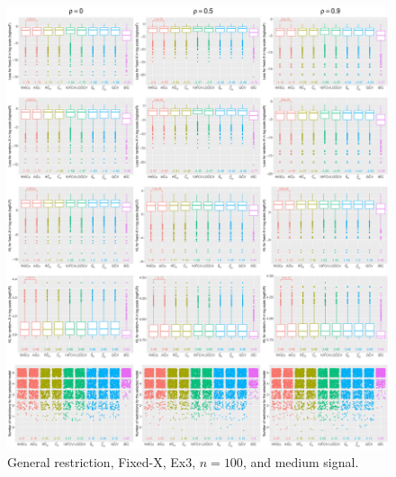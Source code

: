 \clearpage
\begin{figure}[!ht]
\centering
\includegraphics[width=\textwidth]{figures/supplement/fixedx/general_restriction/Ex3_n100_msnr.eps}
\caption{General restriction, Fixed-X, Ex3, $n=100$, and medium signal.}
\end{figure}
\clearpage
